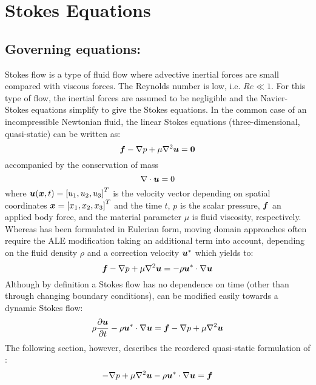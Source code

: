 \section{Stokes Equations}

\subsection{Governing equations:}

Stokes flow is a type of fluid flow where advective inertial forces are small
compared with viscous forces. The Reynolds number is low, i.e.
$\textit{Re}\ll 1$. For this type of flow, the inertial forces are assumed to
be negligible and the Navier-Stokes equations simplify to give the Stokes
equations. In the common case of an incompressible Newtonian fluid, the linear
Stokes equations (three-dimensional, quasi-static) can be written as:
\begin{equation}
    \vectr{f}-\gradient{}{p}+\mu\laplacian{}{\vectr{u}}=\vectr{0}
  \label{eqn:Stokesequation1}
\end{equation}
accompanied by the conservation of mass
\begin{equation}
  \divergence{}{\vectr{u}}=0
  \label{eqn:Stokesmasequation}
\end{equation}
where $\boldsymbol{u}(\boldsymbol{x},t)={\left[ u_1,u_2,u_3 \right]}^{T}$ is the
velocity vector depending on spatial coordinates $\boldsymbol{x}={\left[ x_1,x_2,x_3 \right]}^{T}$
and the time $t$, $p$ is the scalar pressure, $\boldsymbol{f}$ an applied body
force, and the material parameter $\mu$ is fluid viscosity,
respectively. Whereas  has been formulated in
Eulerian form, moving domain approaches often require the ALE modification
taking an additional term into account, depending on the fluid density $\rho$
and a correction velocity $\boldsymbol{u}^*$ which yields to:
\begin{equation}
  \vectr{f}-\gradient{}{p}+\mu\laplacian{}{\vectr{u}}=-\rho\dotprod{\vectr{u}^*}{\gradient{}{\vectr{u}}}
  \label{eqn:StokesequationALE}
\end{equation}
Although by definition a Stokes flow has no dependence on time (other than
through changing boundary conditions),  can be
modified easily towards a dynamic Stokes flow:
\begin{equation}
    \rho\delby{\vectr{u}}{t}-\rho\dotprod{\vectr{u}^*}{\gradient{}{\vectr{u}}}=\vectr{f}-\gradient{}{p}+\mu\laplacian{}{\vectr{u}}
  \label{eqn:Stokesequation2}
\end{equation}
The following section, however, describes the reordered quasi-static
formulation of :
\begin{equation}
    -\gradient{}{p}+\mu\laplacian{}{\vectr{u}}-\rho\dotprod{\vectr{u}^*}{\gradient{}{\vectr{u}}}=\vectr{f}
  \label{eqn:StokesequationALE2}
\end{equation}

